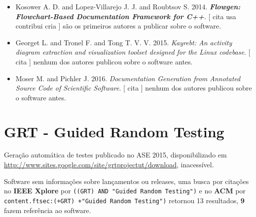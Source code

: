 \begin{itemize}
\item Kosower A. D. and Lopez-Villarejo J. J. and Roubtsov S.
      2014.
        \textbf{\textit{ Flowgen: Flowchart-Based Documentation Framework for C++}}.
      [
          cita
          usa
          contribui
          cria
      ]
são os primeiros autores a publicar sobre o software.
\item Georget L. and Tronel F. and Tong T. V. V.
      2015.
        \textit{ Kayrebt: An activity diagram extraction and visualization toolset designed for the Linux codebase}.
      [
          cita
      ]
nenhum dos autores publicou sobre o software antes.
\item Moser M. and Pichler J.
      2016.
        \textit{ Documentation Generation from Annotated Source Code of Scientific Software}.
      [
          cita
      ]
nenhum dos autores publicou sobre o software antes.
\end{itemize}
\section{GRT - Guided Random Testing}

Geração automática de testes
publicado no ASE 2015,
disponibilizado em \url{http://www.sites.google.com/site/grtprojectut/download},
inacessível.

Software sem informações sobre lançamentos ou releases,
uma busca por citações no {\bf IEEE Xplore} por
\texttt{((GRT) AND "Guided Random Testing")}
e no {\bf ACM} por
\texttt{content.ftsec:(+GRT) +"Guided Random Testing")}
retornou
13 resultados,
{\bf 9} fazem referência ao software.



